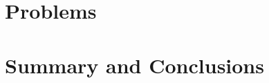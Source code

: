 \documentclass{report}
\begin{document}

\part{Problems}





\part{Summary and Conclusions}
\end{document}
